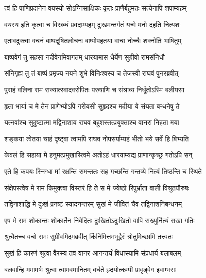 \twolineshloka
{त्वं हि पाणिप्रदानेन वयस्यो सोऽग्निसाक्षिकः}
{कृतः प्राणैर्बहुमतः सत्येनापि शपाम्यहम्} %

\twolineshloka
{वयस्य इति कृत्वा च विस्रब्धं प्रवदाम्यहम्}
{दुःखमन्तर्गतं यन्मे मनो दहति नित्यशः} %

\twolineshloka
{एतावदुक्त्वा वचनं बाष्पदूषितलोचनः}
{बाष्पोपहतया वाचा नोच्चैः शक्नोति भाषितुम्} %

\twolineshloka
{बाष्पवेगं तु सहसा नदीवेगमिवागतम्}
{धारयामास धैर्येण सुग्रीवो रामसंनिधौ} %

\twolineshloka
{संनिगृह्य तु तं बाष्पं प्रमृज्य नयने शुभे}
{विनिःश्वस्य च तेजस्वी राघवं पुनरब्रवीत्} %

\twolineshloka
{पुराहं वलिना राम राज्यात्स्वादवरोपितः}
{परुषाणि च संश्राव्य निर्धूतोऽस्मि बलीयसा} %

\twolineshloka
{हृता भार्या च मे तेन प्राणेभ्योऽपि गरीयसी}
{सुहृदश्च मदीया ये संयता बन्धनेषु ते} %

\twolineshloka
{यत्नवांश्च सुदुष्टात्मा मद्विनाशाय राघव}
{बहुशस्तत्प्रयुक्ताश्च वानरा निहता मया} %

\twolineshloka
{शङ्कया त्वेतया चाहं दृष्ट्वा त्वामपि राघव}
{नोपसर्पाम्यहं भीतो भये सर्वे हि बिभ्यति} %

\twolineshloka
{केवलं हि सहाया मे हनुमत्प्रमुखास्त्विमे}
{अतोऽहं धारयाम्यद्य प्राणान्कृच्छ्र गतोऽपि सन्} %

\twolineshloka
{एते हि कपयः स्निग्धा मां रक्षन्ति समन्ततः}
{सह गच्छन्ति गन्तव्ये नित्यं तिष्ठन्ति च स्थिते} %

\twolineshloka
{संक्षेपस्त्वेष मे राम किमुक्त्वा विस्तरं हि ते}
{स मे ज्येष्ठो रिपुर्भ्राता वाली विश्रुतपौरुषः} %

\twolineshloka
{तद्विनाशाद्धि मे दुःखं प्रनष्टं स्यादनन्तरम्}
{सुखं मे जीवितं चैव तद्विनाशनिबन्धनम्} %

\twolineshloka
{एष मे राम शोकान्तः शोकार्तेन निवेदितः}
{दुःखितोऽदुःखितो वापि सख्युर्नित्यं सखा गतिः} %

\twolineshloka
{श्रुत्वैतच्च वचो रामः सुग्रीवमिदमब्रवीत्}
{किंनिमित्तमभूद्वैरं श्रोतुमिच्छामि तत्त्वतः} %

\twolineshloka
{सुखं हि कारणं श्रुत्वा वैरस्य तव वानर}
{आनन्तर्यं विधास्यामि संप्रधार्य बलाबलम्} %

\twolineshloka
{बलवान्हि ममामर्षः श्रुत्वा त्वामवमानितम्}
{वर्धते हृदयोत्कम्पी प्रावृड्वेग इवाम्भसः} %

